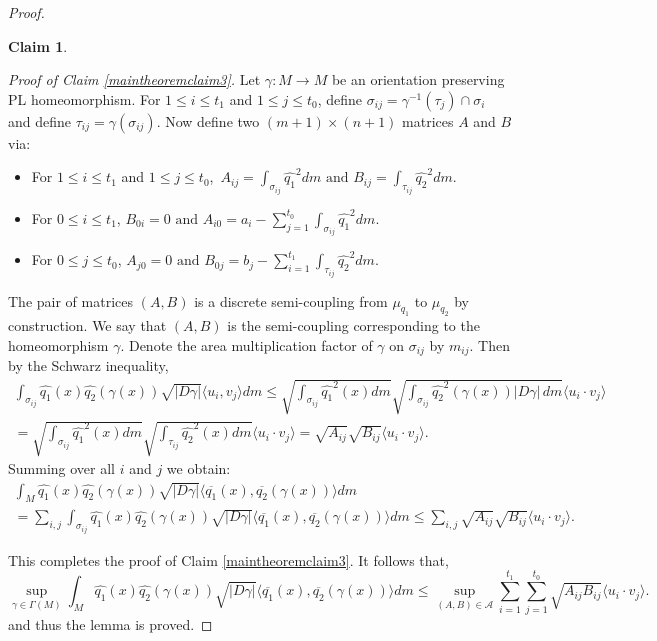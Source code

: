 \documentclass[final,hidelinks,onefignum,onetabnum]{siamart220329}
\newtheorem{claim}{Claim}
\begin{document}
\begin{proof}
\begin{claim}
\end{claim}
\noindent\textit{Proof of Claim \ref{maintheoremclaim3}. }Let $\gamma:M\to M$ be an orientation preserving PL homeomorphism. For $1\leq i\leq t_1$ and $1\leq j\leq t_0$, define $\sigma_{ij}=\gamma^{-1}(\tau_j)\cap\sigma_i$ and define $\tau_{ij}=\gamma(\sigma_{ij})$. Now define two $(m+1)\times (n+1)$ matrices $A$ and $B$ via:
\begin{itemize}
    \item For $1\leq i\leq t_1$ and $1\leq j\leq t_0$,\, ${\displaystyle A_{ij}=\int_{\sigma_{ij}}\hat{q_1}^2dm \text{ and } B_{ij}=\int_{\tau_{ij}}\hat{q_2}^2dm}.$
    \item For $0\leq i\leq t_1$, $B_{0i}=0\text{ and }\displaystyle{A_{i0}=a_i-\sum\limits_{j=1}^{t_0}\int_{\sigma_{ij}}\hat{q_1}^2dm}.$
    \item For $0\leq j\leq t_0$, $A_{j0}=0\text{ and }\displaystyle{B_{0j}=b_j-\sum\limits_{i=1}^{t_1}\int_{\tau_{ij}}\hat{q_2}^2dm}.$
\end{itemize}

\noindent The pair of matrices $(A,B)$ is a discrete semi-coupling from $\mu_{q_1}$ to $\mu_{q_2}$ by construction. We say that $(A,B)$ is the semi-coupling corresponding to the homeomorphism $\gamma$. Denote the area multiplication factor of $\gamma$ on $\sigma_{ij}$ by $m_{ij}$. Then by the Schwarz inequality,
\begin{multline*}
    \int_{\sigma_{ij}} \hat{q_1}(x)\hat{q_2}(\gamma(x))\sqrt{|D\gamma|}\langle u_i,v_j\rangle dm\leq \sqrt{\int_{\sigma_{ij}} \hat{q_1}^2(x) dm}\sqrt{\int_{\sigma_{ij}} \hat{q_2}^2(\gamma(x))|D\gamma|\,dm} \langle  u_i\cdot v_j\rangle\\
    =\sqrt{\int_{\sigma_{ij}} \hat{q_1}^2(x) dm}\sqrt{\int_{\tau_{ij}} \hat{q_2}^2(x)dm} \langle  u_i\cdot v_j\rangle=\sqrt{A_{ij}}\sqrt{B_{ij}}\langle u_i\cdot v_j\rangle.
\end{multline*}
Summing over all $i$ and $j$ we obtain:
\begin{multline*}
    \int_{M} \hat{q_1}(x)\hat{q_2}(\gamma(x))\sqrt{|D\gamma|}\langle\overline{q_1}(x),\overline{q_2}(\gamma(x))\rangle dm \\=\sum_{i,j}\int_{\sigma_{ij}} \hat{q_1}(x)\hat{q_2}(\gamma(x))\sqrt{|D\gamma|}\langle\overline{q_1}(x),\overline{q_2}(\gamma(x))\rangle dm\leq \sum_{i,j}\sqrt{A_{ij}}\sqrt{B_{ij}}\langle u_i\cdot v_j\rangle.
\end{multline*}

This completes the proof of Claim \ref{maintheoremclaim3}. It follows that,
\begin{equation*} \sup_{\gamma \in \Gamma(M)}\int_M \hat{q_1}(x)\hat{q_2}(\gamma(x))\sqrt{|D\gamma|}\langle\overline{q_1}(x),\overline{q_2}(\gamma(x))\rangle dm\leq\sup_{(A,B)\in\mathcal{A}}\sum_{i=1}^{t_1}\sum_{j=1}^{t_0}\sqrt{A_{ij}B_{ij}}\langle u_i\cdot v_j\rangle.\end{equation*}
and thus the lemma is proved.
\end{proof}
\end{document}
